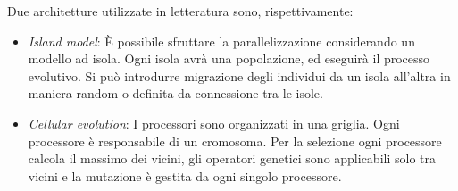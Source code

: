\documentclass[10pt,a4paper]{article}
\begin{document}
Due architetture utilizzate in letteratura sono, rispettivamente:

\begin{itemize}
\item{\emph{Island model}: È possibile sfruttare la parallelizzazione considerando un modello ad isola. Ogni
isola avrà una popolazione, ed eseguirà il processo evolutivo. Si può introdurre migrazione degli individui da un isola all’altra in maniera random o definita da connessione tra le isole.}
\item{\emph{Cellular evolution}: I processori sono organizzati in una griglia. Ogni processore è responsabile di
un cromosoma.
Per la selezione ogni processore calcola il massimo dei vicini, gli operatori genetici sono applicabili solo tra vicini e la mutazione è gestita da ogni singolo
processore.}
\end{itemize}
\end{document}
